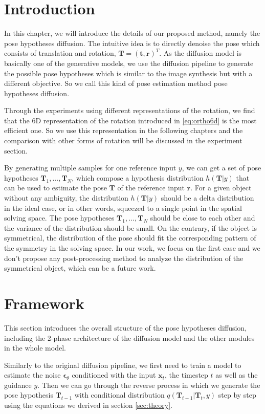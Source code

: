 \documentclass[12pt,DIV14,BCOR12mm,a4paper,footinclude=false,headinclude,parskip=half-,twoside,openright,cleardoublepage=empty,toc=index,bibliography=totoc,listof=totoc]{scrreprt}
\numberwithin{equation}{chapter}
\begin{document}
\section{Introduction}
In this chapter, we will introduce the details of our proposed method, namely the pose hypotheses diffusion. The intuitive idea is to directly denoise the pose which consists of translation and rotation, $\mathbf{T} = (\mathbf{t}, \mathbf{r})^{T}$. As the diffusion model is basically one of the generative models, we use the diffusion pipeline to generate the possible pose hypotheses which is similar to the image synthesis but with a different objective. So we call this kind of pose estimation method pose hypotheses diffusion.

Through the experiments using different representations of the rotation, we find that the 6D representation of the rotation introduced in \ref{eq:ortho6d} is the most efficient one. So we use this representation in the following chapters and the comparison with other forms of rotation will be discussed in the experiment section.

By generating multiple samples for one reference input $y$, we can get a set of pose hypotheses $\mathbf{T}_{1},...,\mathbf{T}_{N}$, which compose a hypothesis distribution $h(\mathbf{T}|y)$ that can be used to estimate the pose $\mathbf{T}$ of the reference input $\mathbf{r}$. For a given object without any ambiguity, the distribution $h(\mathbf{T}|y)$ should be a delta distribution in the ideal case, or in other words, squeezed to a single point in the spatial solving space. The pose hypotheses $\mathbf{T}_{1},...,\mathbf{T}_{N}$ should be close to each other and the variance of the distribution should be small. On the contrary, if the object is symmetrical, the distribution of the pose should fit the corresponding pattern of the symmetry in the solving space. In our work, we focus on the first case and we don't propose any post-processing method to analyze the distribution of the symmetrical object, which can be a future work.

\section{Framework}
This section introduces the overall structure of the pose hypotheses diffusion, including the 2-phase architecture of the diffusion model and the other modules in the whole model.

Similarly to the original diffusion pipeline, we first need to train a model to estimate the noise $\boldsymbol{\epsilon}_{\theta}$ conditioned with the input $\mathbf{x}_{t}$, the timestep $t$ as well as the guidance $y$. Then we can go through the reverse process in which we generate the pose hypothesis $\mathbf{T}_{t-1}$ with conditional distribution $q(\mathbf{T}_{t-1}|\mathbf{T}_{t},y)$ step by step using the equations we derived in section \ref{sec:theory}.
\end{document}
